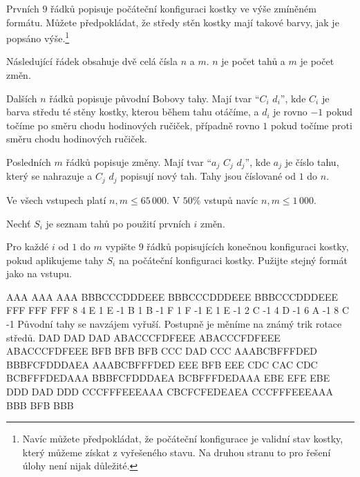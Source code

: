 
Prvních $9$ řádků popisuje počáteční konfiguraci kostky
ve výše zmíněném formátu. Můžete předpokládat, že středy
stěn kostky mají takové barvy, jak je popsáno
výše.\footnote{Navíc můžete předpokládat, že počáteční konfigurace
je validní stav kostky, který můžeme získat z vyřešeného stavu.
Na druhou stranu to pro řešení úlohy není nijak důležité.}

Následující řádek obsahuje dvě celá čísla $n$ a $m$.
$n$ je počet tahů a $m$ je počet změn.

Dalších $n$ řádků popisuje původní Bobovy tahy.
Mají tvar ``$C_i$ $d_i$'',
kde $C_i$ je barva středu té stěny kostky,
kterou během tahu otáčíme, a $d_i$ je rovno $-1$
pokud točíme po směru chodu hodinových ručiček, případně
rovno $1$ pokud točíme proti směru chodu hodinových ručiček.

Posledních $m$ řádků popisuje změny.
Mají tvar ``$a_j$ $C_j$ $d_j$'',
kde $a_j$ je číslo tahu, který se nahrazuje
a $C_j$ $d_j$ popisují nový tah.
Tahy jsou číslované od $1$ do $n$.


Ve všech vstupech platí $n, m \leq 65\,000$.
V $50\%$ vstupů navíc $n, m \leq 1\,000$.

\pagebreak


Nechť $S_i$ je seznam tahů po použití prvních $i$ změn.

Pro každé $i$ od $1$ do $m$ vypište $9$ řádků popisujících konečnou konfiguraci kostky, pokud aplikujeme tahy $S_i$ na počáteční konfiguraci kostky. Pužijte stejný formát jako na vstupu.


\sampleIN
AAA
AAA
AAA
BBBCCCDDDEEE
BBBCCCDDDEEE
BBBCCCDDDEEE
FFF
FFF
FFF
8 4
E 1
E -1
B 1
B -1
F 1
F -1
E 1
E -1
2 C -1
4 D -1
6 A -1
8 C -1
\sampleCOMMENT
Původní tahy se navzájem vyřuší.
Postupně je měníme na známý trik
rotace středů.
\sampleOUT
DAD
DAD
DAD
ABACCCFDFEEE
ABACCCFDFEEE
ABACCCFDFEEE
BFB
BFB
BFB
CCC
DAD
CCC
AAABCBFFFDED
BBBFCFDDDAEA
AAABCBFFFDED
EEE
BFB
EEE
CDC
CAC
CDC
BCBFFFDEDAAA
BBBFCFDDDAEA
BCBFFFDEDAAA
EBE
EFE
EBE
DDD
DAD
DDD
CCCFFFEEEAAA
CBCFCFEDEAEA
CCCFFFEEEAAA
BBB
BFB
BBB
\sampleEND



